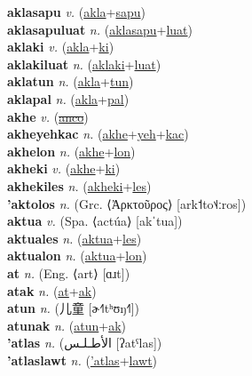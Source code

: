 \textbf{aklasapu} \textit{v.} (\hyperref[akla]{akla}+\hyperref[sapu]{sapu})
 \label{aklasapu} \\
\textbf{aklasapuluat} \textit{n.} (\hyperref[aklasapu]{aklasapu}+\hyperref[luat]{luat})
 \label{aklasapuluat} \\
\textbf{aklaki} \textit{v.} (\hyperref[akla]{akla}+\hyperref[ki]{ki})
 \label{aklaki} \\
\textbf{aklakiluat} \textit{n.} (\hyperref[aklaki]{aklaki}+\hyperref[luat]{luat})
 \label{aklakiluat} \\
\textbf{aklatun} \textit{n.} (\hyperref[akla]{akla}+\hyperref[tun]{tun})
 \label{aklatun} \\
\textbf{aklapal} \textit{n.} (\hyperref[akla]{akla}+\hyperref[pal]{pal})
 \label{aklapal} \\
\textbf{akhe} \textit{v.} (\hyperref[anco]{\sout{anco}})
 \label{akhe} \\
\textbf{akheyehkac} \textit{n.} (\hyperref[akhe]{akhe}+\hyperref[yeh]{yeh}+\hyperref[kac]{kac})
 \label{akheyehkac} \\
\textbf{akhelon} \textit{n.} (\hyperref[akhe]{akhe}+\hyperref[lon]{lon})
 \label{akhelon} \\
\textbf{akheki} \textit{v.} (\hyperref[akhe]{akhe}+\hyperref[ki]{ki})
 \label{akheki} \\
\textbf{akhekiles} \textit{n.} (\hyperref[akheki]{akheki}+\hyperref[les]{les})
 \label{akhekiles} \\
\textbf{'aktolos} \textit{n.} (Grc. ⟨Ἀρκτοῦρος⟩ [ark˦to˦˨ːros])
 \label{'aktolos} \\
\textbf{aktua} \textit{v.} (Spa. ⟨actúa⟩ [akˈtua])
 \label{aktua} \\
\textbf{aktuales} \textit{n.} (\hyperref[aktua]{aktua}+\hyperref[les]{les})
 \label{aktuales} \\
\textbf{aktualon} \textit{n.} (\hyperref[aktua]{aktua}+\hyperref[lon]{lon})
 \label{aktualon} \\
\textbf{at} \textit{n.} (Eng. ⟨art⟩ [ɑɹt])
 \label{at} \\
\textbf{atak} \textit{n.} (\hyperref[at]{at}+\hyperref[ak]{ak})
 \label{atak} \\
\textbf{atun} \textit{n.} ({\chinese{}儿童} [ɚ˧˥tʰʊŋ˧˥])
 \label{atun} \\
\textbf{atunak} \textit{n.} (\hyperref[atun]{atun}+\hyperref[ak]{ak})
 \label{atunak} \\
\textbf{'atlas} \textit{n.} ({\arabics{}الأطـلـس‎} [ʔatˤlas])
 \label{'atlas} \\
\textbf{'atlaslawt} \textit{n.} (\hyperref['atlas]{'atlas}+\hyperref[lawt]{lawt})
